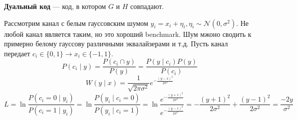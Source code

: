 \begin{definition}
    \textbf{Дуальный код} --- код, в котором \(G\) и \(H\) совпадают.
\end{definition}

Рассмотрим канал с белым гауссовским шумом \(y_i = x_i + \eta_i, \eta_i \sim \mathcal{N}(0, \sigma^2)\).
Не любой канал является таким, но это хороший benchmark.
Шум мжоно сводить к примерно белому гауссову различными эквалайзерами и т.д.
Пусть канал передает \(c_i \in \{0, 1\} \to x_i \in \{-1, 1\}\).
\[P(c_i \mid y) = \frac{P(c_i \cap y)}{P(y)} = \frac{P(y \mid c_i) P(y)}{P(c_i)}\]
\[W(y \mid x) = \frac{1}{\sqrt{2 \pi \sigma^2}} e^{-\frac{(y-x)^2}{2\sigma^2}}\]
\[L
= \ln \frac{P(c_i = 0 \mid y_i)}{P(c_i = 1 \mid y_i)}
= \ln \frac{P(y_i \mid c_i = 0)}{P(y_i \mid c_i = 1)}
= \ln \frac{e^{-\frac{(y+1)^2}{2\sigma^2}}}{e^{-\frac{(y-1)^2}{2\sigma^2}}}
= -\frac{(y+1)^2}{2\sigma^2} + \frac{(y-1)^2}{2\sigma^2}
= \frac{-2y}{\sigma^2}
\]


